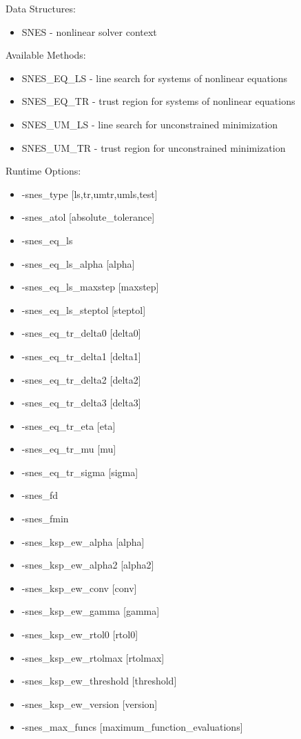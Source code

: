 {\noindent
Data Structures:
\begin{itemize}
\item SNES - nonlinear solver context
\end{itemize}
Available Methods: 
\begin{itemize}
\item SNES\_EQ\_LS - line search for systems of nonlinear equations
\item SNES\_EQ\_TR - trust region for systems of nonlinear equations
\item SNES\_UM\_LS - line search for unconstrained minimization
\item SNES\_UM\_TR - trust region for unconstrained minimization
\end{itemize}
Runtime Options:
\begin{itemize}
\item -snes\_type [ls,tr,umtr,umls,test]
\item -snes\_atol [absolute\_tolerance]
\item -snes\_eq\_ls
\item -snes\_eq\_ls\_alpha [alpha]
\item -snes\_eq\_ls\_maxstep [maxstep]
\item -snes\_eq\_ls\_steptol [steptol]
\item -snes\_eq\_tr\_delta0 [delta0]
\item -snes\_eq\_tr\_delta1 [delta1]
\item -snes\_eq\_tr\_delta2 [delta2]
\item -snes\_eq\_tr\_delta3 [delta3]
\item -snes\_eq\_tr\_eta [eta]
\item -snes\_eq\_tr\_mu [mu]
\item -snes\_eq\_tr\_sigma [sigma]
\item -snes\_fd
\item -snes\_fmin
\item -snes\_ksp\_ew\_alpha [alpha]
\item -snes\_ksp\_ew\_alpha2 [alpha2]
\item -snes\_ksp\_ew\_conv [conv]
\item -snes\_ksp\_ew\_gamma [gamma]
\item -snes\_ksp\_ew\_rtol0 [rtol0]
\item -snes\_ksp\_ew\_rtolmax [rtolmax]
\item -snes\_ksp\_ew\_threshold [threshold]
\item -snes\_ksp\_ew\_version [version]
\item -snes\_max\_funcs [maximum\_function\_evaluations]

\end{itemize}}
